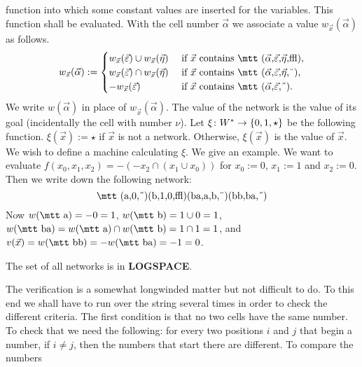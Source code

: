 function into which some constant values are inserted for
the variables. This function shall be evaluated.
With the cell number $\vec{\alpha}$ we associate 
a value $w_{\vec{x}}(\vec{\alpha})$ as follows.
\begin{equation}
w_{\vec{x}}(\vec{\alpha}) := 
\begin{cases}
w_{\vec{x}}(\vec{\varepsilon}) \cup w_{\vec{x}}(\vec{\eta}) &
\text{ if $\vec{x}$ contains 
{\mtt ($\vec{\alpha}$,$\vec{\varepsilon}$,$\vec{\eta}$,\symbol{31})},} \\
w_{\vec{x}}(\vec{\varepsilon}) \cap w_{\vec{x}}(\vec{\eta}) &
\text{ if $\vec{x}$ contains 
{\mtt ($\vec{\alpha}$,$\vec{\varepsilon}$,$\vec{\eta}$,\symbol{4})},} \\
- w_{\vec{x}}(\vec{\varepsilon}) &
\text{ if $\vec{x}$ contains 
{\mtt ($\vec{\alpha}$,$\vec{\varepsilon}$,\symbol{5})}.}
\end{cases}
\end{equation}
We write $w(\vec{\alpha})$ in place of $w_{\vec{x}}(\vec{\alpha})$.
The value of the network is the value of its goal (incidentally
the cell with number $\nu$). Let $\xi \colon W^{\ast} \rightarrow \{0,1,\star\}$
be the following function. $\xi(\vec{x}) := \star$ if $\vec{x}$ is
not a network. Otherwise, $\xi(\vec{x})$ is the value of $\vec{x}$.
We wish to define a machine calculating $\xi$. 
We give an example. We want to evaluate 
$f(x_0, x_1, x_2) = - (- x_2 \cap (x_1 \cup x_0))$
for $x_0 := 0$, $x_1 := 1$ and $x_2 := 0$. Then we write down
the following network:
\begin{equation}
\mbox{\mtt (a,0,\symbol{5})(b,1,0,\symbol{31})(ba,a,b,\symbol{4}%
)(bb,ba,\symbol{5})}
\end{equation}
Now $w(\mbox{\mtt a}) = - 0 = 1$, $w(\mbox{\mtt b}) =
1 \cup 0 = 1$, $w(\mbox{\mtt ba}) = w(\mbox{\mtt a}) \cap
w(\mbox{\mtt b}) = 1 \cap 1 = 1$, and
$v(\vec{x}) = w(\mbox{\mtt bb}) = - w(\mbox{\mtt ba}) =
- 1 = 0$.
\begin{lem}
The set of all networks is in \textbf{LOGSPACE}.
\end{lem}
\proofbeg
The verification is a somewhat longwinded matter but not difficult
to do. To this end we shall have to run over the string several times
in order to check the different criteria. The first condition is that 
no two cells have the same number. To check that we need the following: 
for every two positions $i$ and $j$ that begin a number, if $i \neq j$, 
then the numbers that start there are different. To compare the numbers 
